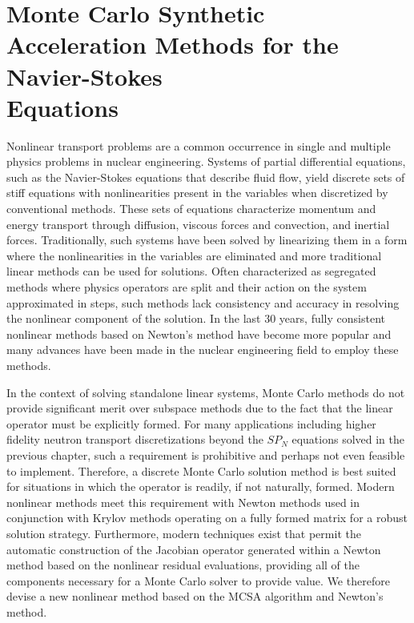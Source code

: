 \chapter{Monte Carlo Synthetic Acceleration Methods for the
  Navier-Stokes \\Equations\ }
\label{ch:nonlinear_problem}
Nonlinear transport problems are a common occurrence in single and
multiple physics problems in nuclear engineering. Systems of partial
differential equations, such as the Navier-Stokes equations that
describe fluid flow, yield discrete sets of stiff equations with
nonlinearities present in the variables when discretized by
conventional methods. These sets of equations characterize momentum
and energy transport through diffusion, viscous forces and convection,
and inertial forces. Traditionally, such systems have been solved by
linearizing them in a form where the nonlinearities in the variables
are eliminated and more traditional linear methods can be used for
solutions. Often characterized as segregated methods where physics
operators are split and their action on the system approximated in
steps, such methods lack consistency and accuracy in resolving the
nonlinear component of the solution. In the last 30 years, fully
consistent nonlinear methods based on Newton's method have become more
popular and many advances have been made in the nuclear engineering
field to employ these methods.

In the context of solving standalone linear systems, Monte Carlo
methods do not provide significant merit over subspace methods due to
the fact that the linear operator must be explicitly formed. For many
applications including higher fidelity neutron transport
discretizations beyond the $SP_N$ equations solved in the previous
chapter, such a requirement is prohibitive and perhaps not even
feasible to implement. Therefore, a discrete Monte Carlo solution
method is best suited for situations in which the operator is readily,
if not naturally, formed. Modern nonlinear methods meet this
requirement with Newton methods used in conjunction with Krylov
methods operating on a fully formed matrix for a robust solution
strategy. Furthermore, modern techniques exist that permit the
automatic construction of the Jacobian operator generated within a
Newton method based on the nonlinear residual evaluations, providing
all of the components necessary for a Monte Carlo solver to provide
value. We therefore devise a new nonlinear method based on the MCSA
algorithm and Newton's method.

